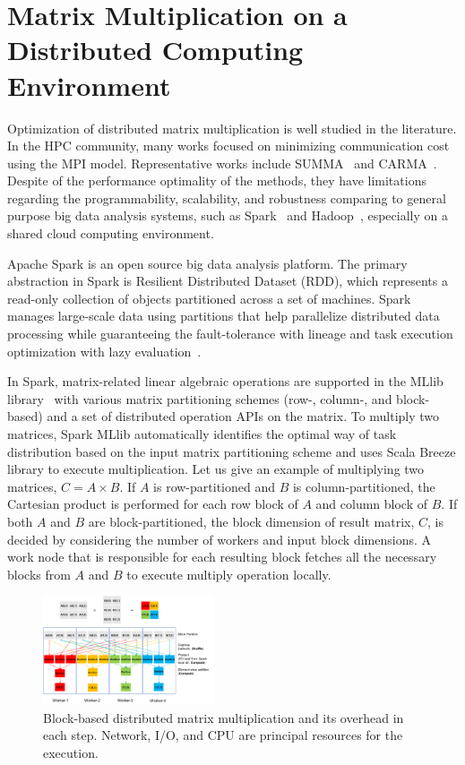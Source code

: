 \documentclass[10pt, conference, compsocconf]{IEEEtran}
\begin{document}
\section{Matrix Multiplication on a Distributed Computing Environment}\label{sec:distributed-matrix-computation}
Optimization of distributed matrix multiplication is well studied in the literature. In the HPC community, many works focused on minimizing communication cost using the MPI model. Representative works include SUMMA~\cite{summa} and CARMA~\cite{carma}. Despite of the performance optimality of the methods, they have limitations regarding the programmability, scalability, and robustness comparing to general purpose big data analysis systems, such as Spark~\cite{spark} and Hadoop~\cite{hadoop}, especially on a shared cloud computing environment.

Apache Spark is an open source big data analysis platform. The primary abstraction in Spark is Resilient Distributed Dataset (RDD), which represents a read-only collection of objects partitioned across a set of machines. Spark manages large-scale data using partitions that help parallelize distributed data processing while guaranteeing the fault-tolerance with lineage and task execution optimization with lazy evaluation~\cite{spark}.

In Spark, matrix-related linear algebraic operations are supported in the MLlib library~\cite{spark-mm} with various matrix partitioning schemes (row-, column-, and block-based) and a set of distributed operation APIs on the matrix. To multiply two matrices, Spark MLlib automatically identifies the optimal way of task distribution based on the input matrix partitioning scheme and uses Scala Breeze library to execute multiplication. Let us give an example of multiplying two matrices, $C = A \times B$. If $A$ is row-partitioned and $B$ is column-partitioned, the Cartesian product is performed for each row block of $A$ and column block of $B$. If both $A$ and $B$ are block-partitioned, the block dimension of result matrix, $C$, is decided by considering the number of workers and input block dimensions. A work node that is responsible for each resulting block fetches all the necessary blocks from $A$ and $B$ to execute multiply operation locally.

\begin{figure}
  \centering\includegraphics[width=0.45\textwidth]{figures/matmult-overhead-non-square-1.pdf}\caption{Block-based distributed matrix multiplication and its overhead in each step. Network, I/O, and CPU are principal resources for the execution.}\label{fig:matmul-with-overhead}
\end{figure}
\end{document}
